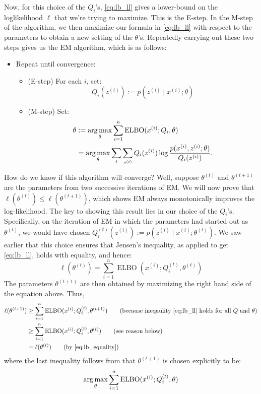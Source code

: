Now, for this choice of the $Q_i$'s, \cref{eq:lb_ll} gives a lower-bound on
the loglikelihood $\ell$ that we're trying to maximize. This is the E-step. In
the M-step of the algorithm, we then maximize our formula in \cref{eq:lb_ll}
with respect to the parameters to obtain a new setting of the $\theta$'s. Repeatedly
carrying out these two steps gives us the EM algorithm, which is as follows:
\begin{itemize}
    \item Repeat until convergence:
    \begin{itemize}
        \item (E-step) For each $i$, set:
        \begin{equation*}
            Q_i(z^{(i)}) := p(z^{(i)} \mid x^{(i)} ;\theta)
        \end{equation*}
        \item (M-step) Set:
        \begin{align}
            \theta &:= \argmax_\theta \sum_{i=1}^n \operatorname{ELBO}(x^{(i)} ;Q_i ,\theta)\\
                &= \argmax_\theta\sum_{i}\sum_{z^{(i)}} Q_i(z^{(i)})\log \frac{p(x^{(i)} ,z^{(i)} ;\theta)}{Q_i(z^{(i)})}.\label{eq:m_step}
        \end{align}
    \end{itemize}
\end{itemize}

How do we know if this algorithm will converge? Well, suppose $\theta^{(t)}$ and
$\theta^{(t+1)}$ are the parameters from two successive iterations of EM. We will now
prove that $\ell(\theta^{(t)} ) \le \ell(\theta^{(t+1)} )$, which shows EM always monotonically
improves the log-likelihood. The key to showing this result lies in our choice of
the $Q_i$'s. Specifically, on the iteration of EM in which the parameters had
started out as $\theta^{(t)}$, we would have chosen $Q^{(t)}_i (z^{(i)}) := p(z^{(i)} \mid x^{(i)} ;\theta^{(t)} )$.
We saw earlier that this choice ensures that Jensen's inequality, as applied to get
\cref{eq:lb_ll}, holds with equality, and hence:
\begin{equation}
    \ell(\theta^{(t)} ) = \sum_{i=1}^n \operatorname{ELBO}(x^{(i)} ;Q^{(t)}_i,\theta^{(t)} )\label{eq:lb_equality}
\end{equation}
The parameters $\theta^{(t+1)}$ are then obtained by maximizing the right hand side
of the equation above. Thus,
\begin{align*}
    \ell(\theta^{(t+1)} ) &\ge \sum_{i=1}^n \operatorname{ELBO}(x^{(i)} ;Q^{(t)}_i,\theta^{(t+1)}) \tag{because ineqaulity \ref{eq:lb_ll} holds for all $Q$ and $\theta$}\\
        &\ge \sum_{i=1}^n \operatorname{ELBO}(x^{(i)} ;Q^{(t)}_i ,\theta^{(t)} ) \tag{see reason below}\\
        &= \ell(\theta^{(t)} ) \tag{by \cref{eq:lb_equality}}
\end{align*}
where the last inequality follows from that $\theta^{(t+1)}$ is chosen explicitly to be:
\begin{equation*}
    \argmax_\theta \sum_{i=1}^n \operatorname{ELBO}(x^{(i)} ;Q^{(t)}_i ,\theta)
\end{equation*}

